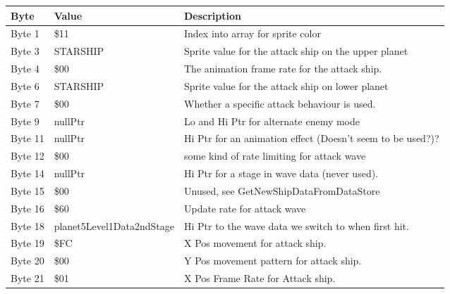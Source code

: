 \begin{figure}[H]
  {
  \setlength{\tabcolsep}{3.0pt}
  \setlength\cmidrulewidth{\heavyrulewidth} %
  \begin{adjustbox}{width=12cm}

\begin{tabular}{lll}
\toprule
 Byte    & Value                     & Description                                                        \\
\midrule
 Byte 1  & \$11                       & Index into array for sprite color                                  \\
 Byte 3  & STARSHIP                  & Sprite value for the attack ship on the upper planet               \\
 Byte 4  & \$00                       & The animation frame rate for the attack ship.                      \\
 Byte 6  & STARSHIP                  & Sprite value for the attack ship on lower planet                   \\
 Byte 7  & \$00                       & Whether a specific attack behaviour is used.                       \\
 Byte 9  & nullPtr                   & Lo and Hi Ptr for alternate enemy mode                             \\
 Byte 11 & nullPtr                   & Hi Ptr for an animation effect (Doesn't seem to be used?)?         \\
 Byte 12 & \$00                       & some kind of rate limiting for attack wave                         \\
 Byte 14 & nullPtr                   & Hi Ptr for a stage in wave data (never used).                      \\
 Byte 15 & \$00                       & Unused, see GetNewShipDataFromDataStore                            \\
 Byte 16 & \$60                       & Update rate for attack wave                                        \\
 Byte 18 & planet5Level1Data2ndStage & Hi Ptr to the wave data we switch to when first hit.               \\
 Byte 19 & \$FC                       & X Pos movement for attack ship.                                    \\
 Byte 20 & \$00                       & Y Pos movement pattern for attack ship.                            \\
 Byte 21 & \$01                       & X Pos Frame Rate for Attack ship.                                  \\

\end{tabular}
\end{adjustbox}}
\end{figure}
